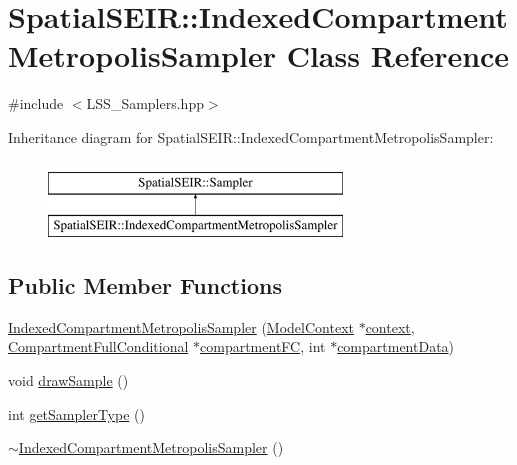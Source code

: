 \hypertarget{classSpatialSEIR_1_1IndexedCompartmentMetropolisSampler}{\section{Spatial\-S\-E\-I\-R\-:\-:Indexed\-Compartment\-Metropolis\-Sampler Class Reference}
\label{classSpatialSEIR_1_1IndexedCompartmentMetropolisSampler}
}


{\ttfamily \#include $<$L\-S\-S\-\_\-\-Samplers.\-hpp$>$}

Inheritance diagram for Spatial\-S\-E\-I\-R\-:\-:Indexed\-Compartment\-Metropolis\-Sampler\-:\begin{figure}[H]
\begin{center}
\leavevmode
\includegraphics[height=2.000000cm]{classSpatialSEIR_1_1IndexedCompartmentMetropolisSampler}
\end{center}
\end{figure}
\subsection*{Public Member Functions}
\begin{DoxyCompactItemize}
\item 
\hyperlink{classSpatialSEIR_1_1IndexedCompartmentMetropolisSampler_ab854404a8d8d53fc77be7a7a90937e43}{Indexed\-Compartment\-Metropolis\-Sampler} (\hyperlink{classSpatialSEIR_1_1ModelContext}{Model\-Context} $\ast$\hyperlink{classSpatialSEIR_1_1IndexedCompartmentMetropolisSampler_a83b05275c5b6e2da4d336eb09d7bb2b5}{context}, \hyperlink{classSpatialSEIR_1_1CompartmentFullConditional}{Compartment\-Full\-Conditional} $\ast$\hyperlink{classSpatialSEIR_1_1IndexedCompartmentMetropolisSampler_a67e3744835088d5612fbc3caf85dbac2}{compartment\-F\-C}, int $\ast$\hyperlink{classSpatialSEIR_1_1IndexedCompartmentMetropolisSampler_ad82e142ca51ec5b9099d4fce0ceed7c3}{compartment\-Data})
\item 
void \hyperlink{classSpatialSEIR_1_1IndexedCompartmentMetropolisSampler_a98bcf6dc5e426a45ef11bf04c1e178dd}{draw\-Sample} ()
\item 
int \hyperlink{classSpatialSEIR_1_1IndexedCompartmentMetropolisSampler_a87fe511f9a9fd517c4bafad59c296986}{get\-Sampler\-Type} ()
\item 
\hyperlink{classSpatialSEIR_1_1IndexedCompartmentMetropolisSampler_a9196ae6955cec850a05b1d6f7784e941}{$\sim$\-Indexed\-Compartment\-Metropolis\-Sampler} ()
\end{DoxyCompactItemize}

